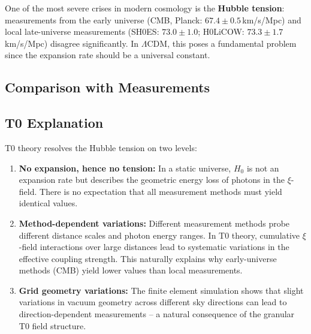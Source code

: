 	One of the most severe crises in modern cosmology is the \textbf{Hubble tension}: measurements from the early universe (CMB, Planck: $67.4 \pm 0.5\,$km/s/Mpc) and local late-universe measurements (SH0ES: $73.0 \pm 1.0$; H0LiCOW: $73.3 \pm 1.7\,$km/s/Mpc) disagree significantly. In $\Lambda$CDM, this poses a fundamental problem since the expansion rate should be a universal constant.
	
	\subsection{Comparison with Measurements}
	
	\begin{center}
	\end{center}
	
	\subsection{T0 Explanation}
	
	T0 theory resolves the Hubble tension on two levels:
	
	\begin{enumerate}
		\item \textbf{No expansion, hence no tension:} In a static universe, $H_0$ is not an expansion rate but describes the geometric energy loss of photons in the $\xi$-field. There is no expectation that all measurement methods must yield identical values.
		
		\item \textbf{Method-dependent variations:} Different measurement methods probe different distance scales and photon energy ranges. In T0 theory, cumulative $\xi$-field interactions over large distances lead to systematic variations in the effective coupling strength. This naturally explains why early-universe methods (CMB) yield lower values than local measurements.
		
		\item \textbf{Grid geometry variations:} The finite element simulation shows that slight variations in vacuum geometry across different sky directions can lead to direction-dependent measurements -- a natural consequence of the granular T0 field structure.
	\end{enumerate}
	
